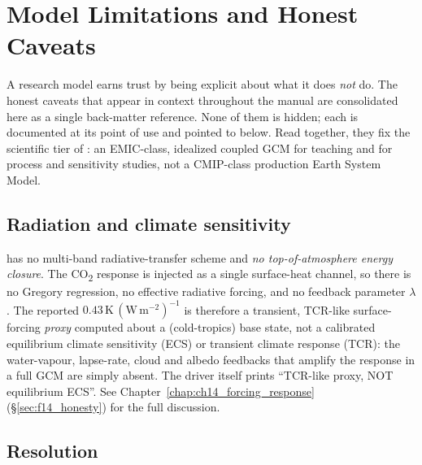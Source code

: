 \chapter{Model Limitations and Honest Caveats}\label{chap:appE_limitations}

A research model earns trust by being explicit about what it does \emph{not} do.
The honest caveats that appear in context throughout the manual are consolidated
here as a single back-matter reference. None of them is hidden; each is documented
at its point of use and pointed to below. Read together, they fix the scientific
tier of \model{}: an EMIC-class, idealized coupled GCM for teaching and for
process and sensitivity studies, not a CMIP-class production Earth System Model.

\section{Radiation and climate sensitivity}\label{sec:appE_radiation}

\model{} has no multi-band radiative-transfer scheme and \emph{no top-of-atmosphere
energy closure}. The CO\textsubscript{2} response is injected as a single
surface-heat channel, so there is no Gregory regression, no effective radiative
forcing, and no feedback parameter $\lambda$. The reported
$0.43\,\mathrm{K\,(W\,m^{-2})^{-1}}$ is therefore a transient, TCR-like
surface-forcing \emph{proxy} computed about a (cold-tropics) base state, not a
calibrated equilibrium climate sensitivity (ECS) or transient climate response
(TCR): the water-vapour, lapse-rate, cloud and albedo feedbacks that amplify the
response in a full GCM are simply absent. The driver itself prints
``TCR-like proxy, NOT equilibrium ECS''. See
Chapter~\ref{chap:ch14_forcing_response} (\S\ref{sec:f14_honesty}) for the full
discussion.

\section{Resolution}\label{sec:appE_resolution}

